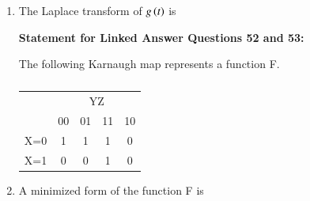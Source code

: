 \documentclass[12pt]{article}
\theoremstyle{remark}
\begin{document}
\begin{enumerate}
\item The Laplace transform of $g\left(t\right)$ is
\begin{enumerate}
\end{enumerate}
\hfill{}

\newpage
\begin{flushleft}
\textbf{Statement for Linked Answer Questions 52 and 53:}
\end{flushleft}
The following Karnaugh map represents a function F.
\begin{table}[H]
    \centering
    \begin{tabular}{l|c|c|c|c|}
      \multicolumn{1}{c}{} & \multicolumn{4}{c}{YZ} \\
      \cline{2-5}
      & 00 & 01 & 11 & 10 \\
      \hline
      \multicolumn{1}{|l|}{X=0} & 1 & 1 & 1 & 0 \\
      \hline
      \multicolumn{1}{|l|}{X=1} & 0 & 0 & 1 & 0 \\
      \hline
    \end{tabular}
    \caption{}
    \label{table:1.1}
\end{table}

\item A minimized form of the function F is
\begin{enumerate}
\end{enumerate}
\hfill{}


\end{enumerate}
\end{document}
